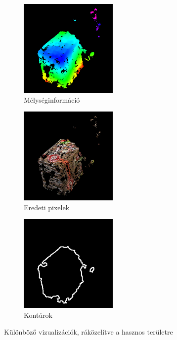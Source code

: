 \begin{figure}[tbh]
\centering
\begin{subfigure}[b]{.33\linewidth}
	\centering
	\includegraphics[width=135pt]{figures/visu_depth.png}
	\caption{Mélységinformáció}
  \end{subfigure}
\begin{subfigure}[b]{.32\linewidth}
	\centering
	\includegraphics[width=135pt]{figures/visu_pixels.png}
	\caption{Eredeti pixelek}
  \end{subfigure}
\begin{subfigure}[b]{.32\linewidth}
	\centering
	\includegraphics[width=135pt]{figures/visu_contours.png}
	\caption{Kontúrok}
  \end{subfigure}
\caption{Különböző vizualizációk, ráközelítve a hasznos területre \label{fig:different-vis}}
\end{figure}

